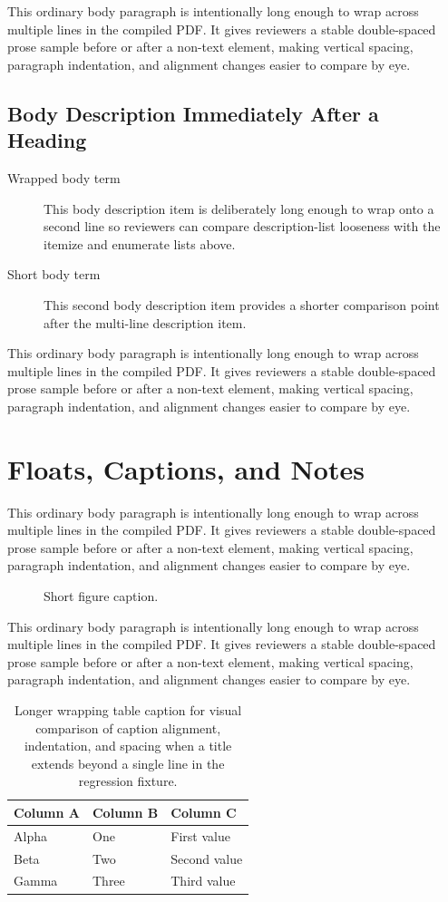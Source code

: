 \documentclass{ndsudisq}
\newcommand{\spacingfiller}{This ordinary body paragraph is intentionally long enough to wrap across multiple lines in the compiled PDF. It gives reviewers a stable double-spaced prose sample before or after a non-text element, making vertical spacing, paragraph indentation, and alignment changes easier to compare by eye.}
\begin{document}
\spacingfiller

\subsection{Body Description Immediately After a Heading}
\begin{description}
  \item[Wrapped body term] This body description item is deliberately long enough to wrap onto a second line so reviewers can compare description-list looseness with the itemize and enumerate lists above.
  \item[Short body term] This second body description item provides a shorter comparison point after the multi-line description item.
\end{description}

\spacingfiller

\section{Floats, Captions, and Notes}
\label{sec:floats-captions-notes}
\spacingfiller

\begin{figure}[htbp]
\centering
\fbox{\rule{0pt}{1.5in}\rule{0.64\textwidth}{0pt}}
\caption{Short figure caption.}
\label{fig:spacing-short-caption}
\end{figure}

\spacingfiller

\begin{table}[htbp]
\centering
\caption{Longer wrapping table caption for visual comparison of caption alignment, indentation, and spacing when a title extends beyond a single line in the regression fixture.}
\label{tab:spacing-long-caption}
\begin{tabular}{lll}
\toprule
Column A & Column B & Column C \\
\midrule
Alpha & One & First value \\
Beta & Two & Second value \\
Gamma & Three & Third value \\
\bottomrule
\end{tabular}
\end{table}
\end{document}
